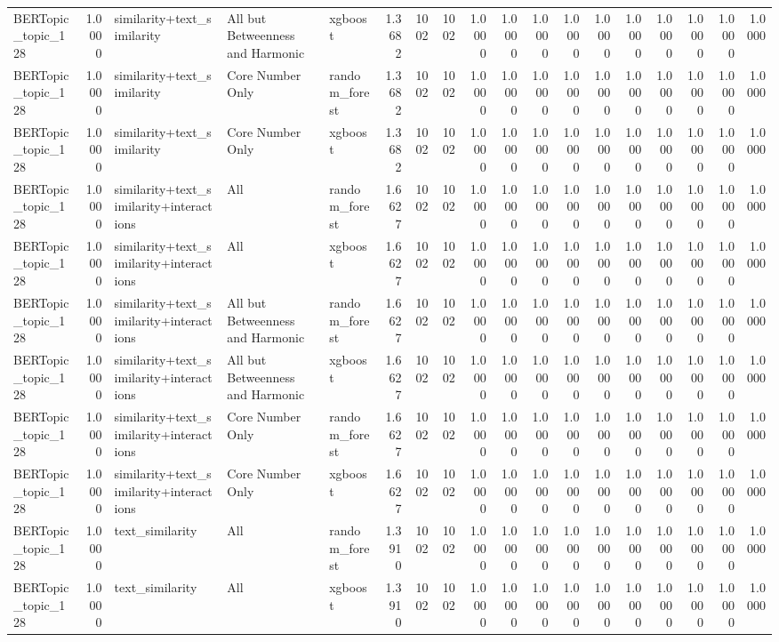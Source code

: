 \begin{tabular}{lrlllrrrrrrrrrrrrr}
BERTopic_topic_128 & 1.0000 & similarity+text_similarity & All but Betweenness and Harmonic & xgboost & 1.3682 & 1002 & 1002 & 1.0000 & 1.0000 & 1.0000 & 1.0000 & 1.0000 & 1.0000 & 1.0000 & 1.0000 & 1.0000 & 1.0000 \\
BERTopic_topic_128 & 1.0000 & similarity+text_similarity & Core Number Only & random_forest & 1.3682 & 1002 & 1002 & 1.0000 & 1.0000 & 1.0000 & 1.0000 & 1.0000 & 1.0000 & 1.0000 & 1.0000 & 1.0000 & 1.0000 \\
BERTopic_topic_128 & 1.0000 & similarity+text_similarity & Core Number Only & xgboost & 1.3682 & 1002 & 1002 & 1.0000 & 1.0000 & 1.0000 & 1.0000 & 1.0000 & 1.0000 & 1.0000 & 1.0000 & 1.0000 & 1.0000 \\
BERTopic_topic_128 & 1.0000 & similarity+text_similarity+interactions & All & random_forest & 1.6627 & 1002 & 1002 & 1.0000 & 1.0000 & 1.0000 & 1.0000 & 1.0000 & 1.0000 & 1.0000 & 1.0000 & 1.0000 & 1.0000 \\
BERTopic_topic_128 & 1.0000 & similarity+text_similarity+interactions & All & xgboost & 1.6627 & 1002 & 1002 & 1.0000 & 1.0000 & 1.0000 & 1.0000 & 1.0000 & 1.0000 & 1.0000 & 1.0000 & 1.0000 & 1.0000 \\
BERTopic_topic_128 & 1.0000 & similarity+text_similarity+interactions & All but Betweenness and Harmonic & random_forest & 1.6627 & 1002 & 1002 & 1.0000 & 1.0000 & 1.0000 & 1.0000 & 1.0000 & 1.0000 & 1.0000 & 1.0000 & 1.0000 & 1.0000 \\
BERTopic_topic_128 & 1.0000 & similarity+text_similarity+interactions & All but Betweenness and Harmonic & xgboost & 1.6627 & 1002 & 1002 & 1.0000 & 1.0000 & 1.0000 & 1.0000 & 1.0000 & 1.0000 & 1.0000 & 1.0000 & 1.0000 & 1.0000 \\
BERTopic_topic_128 & 1.0000 & similarity+text_similarity+interactions & Core Number Only & random_forest & 1.6627 & 1002 & 1002 & 1.0000 & 1.0000 & 1.0000 & 1.0000 & 1.0000 & 1.0000 & 1.0000 & 1.0000 & 1.0000 & 1.0000 \\
BERTopic_topic_128 & 1.0000 & similarity+text_similarity+interactions & Core Number Only & xgboost & 1.6627 & 1002 & 1002 & 1.0000 & 1.0000 & 1.0000 & 1.0000 & 1.0000 & 1.0000 & 1.0000 & 1.0000 & 1.0000 & 1.0000 \\
BERTopic_topic_128 & 1.0000 & text_similarity & All & random_forest & 1.3910 & 1002 & 1002 & 1.0000 & 1.0000 & 1.0000 & 1.0000 & 1.0000 & 1.0000 & 1.0000 & 1.0000 & 1.0000 & 1.0000 \\
BERTopic_topic_128 & 1.0000 & text_similarity & All & xgboost & 1.3910 & 1002 & 1002 & 1.0000 & 1.0000 & 1.0000 & 1.0000 & 1.0000 & 1.0000 & 1.0000 & 1.0000 & 1.0000 & 1.0000 \\

\end{tabular}
